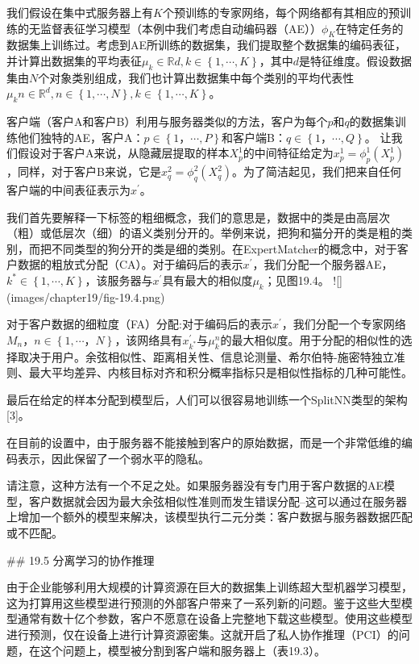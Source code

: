 我们假设在集中式服务器上有$K$个预训练的专家网络，每个网络都有其相应的预训练的无监督表征学习模型（本例中我们考虑自动编码器（AE））$\phi_{K}$在特定任务的数据集上训练过。考虑到AE所训练的数据集，我们提取整个数据集的编码表征，并计算出数据集的平均表征$\mu_{k} \in \mathbb{R}{d}, k \in \left\{ 1, \cdots, K \right\}$，其中$d$是特征维度。假设数据集由$N$个对象类别组成，我们也计算出数据集中每个类别的平均代表性$\mu_{k}{n} \in \mathbb{R}^{d}, n \in \left\{ 1, \cdots, N \right\}, k \in \left\{ 1, \cdots, K \right\}$。

客户端（客户A和客户B）利用与服务器类似的方法，客户为每个$p$和$q$的数据集训练他们独特的AE，客户A：$p \in \left\{ 1，\cdots, P \right\}$和客户端B：$q \in \left\{ 1，\cdots, Q \right\}$。 让我们假设对于客户A来说，从隐藏层提取的样本$X^1_p$的中间特征给定为$x^1_p = \phi^1_p(X^1_p)$，同样，对于客户B来说，它是$x^2_q = \phi^2_q(X^2_q)$。为了简洁起见，我们把来自任何客户端的中间表征表示为$x^{'}$。

我们首先要解释一下标签的粗细概念，我们的意思是，数据中的类是由高层次（粗）或低层次（细）的语义类别分开的。举例来说，把狗和猫分开的类是粗的类别，而把不同类型的狗分开的类是细的类别。在ExpertMatcher的概念中，对于客户数据的粗放式分配（CA）。对于编码后的表示$x^{'}$，我们分配一个服务器AE，$k^{*} \in \left\{ 1, \cdots, K \right\}$，该服务器与$x^{'}$具有最大的相似度$\mu_{k}$；见图19.4。
![](images/chapter19/fig-19.4.png)

对于客户数据的细粒度（FA）分配:对于编码后的表示$x^{'}$，我们分配一个专家网络$M_{n}，n \in \left\{ 1, \cdots，N \right\}$，该网络具有$x^{'}_{k^{*}}$与$\mu^{n}_{k}$的最大相似度。用于分配的相似性的选择取决于用户。余弦相似性、距离相关性、信息论测量、希尔伯特-施密特独立准则、最大平均差异、内核目标对齐和积分概率指标只是相似性指标的几种可能性。

最后在给定的样本分配到模型后，人们可以很容易地训练一个SplitNN类型的架构[3]。

在目前的设置中，由于服务器不能接触到客户的原始数据，而是一个非常低维的编码表示，因此保留了一个弱水平的隐私。

请注意，这种方法有一个不足之处。如果服务器没有专门用于客户数据的AE模型，客户数据就会因为最大余弦相似性准则而发生错误分配--这可以通过在服务器上增加一个额外的模型来解决，该模型执行二元分类：客户数据与服务器数据匹配或不匹配。

## 19.5 分离学习的协作推理

由于企业能够利用大规模的计算资源在巨大的数据集上训练超大型机器学习模型，这为打算用这些模型进行预测的外部客户带来了一系列新的问题。鉴于这些大型模型通常有数十亿个参数，客户不愿意在设备上完整地下载这些模型。使用这些模型进行预测，仅在设备上进行计算资源密集。这就开启了私人协作推理（PCI）的问题，在这个问题上，模型被分割到客户端和服务器上（表19.3）。

